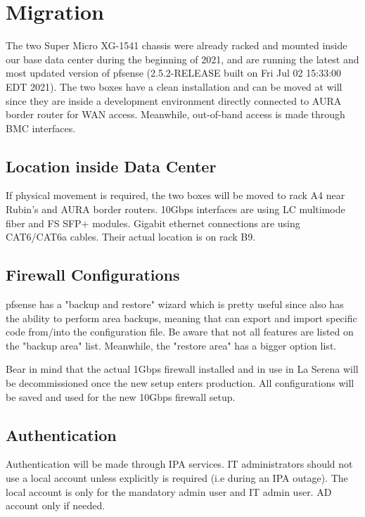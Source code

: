 \section{Migration}

The two Super Micro XG-1541 chassis were already racked and mounted inside our base data center during the beginning of 2021, and are running the latest and most updated version of pfsense (2.5.2-RELEASE built on Fri Jul 02 15:33:00 EDT 2021). The two boxes have a clean installation and can be moved at will since they are inside a development environment directly connected to AURA border router for WAN access. Meanwhile, out-of-band access is made through BMC interfaces.

\subsection{Location inside Data Center}

If physical movement is required, the two boxes will be moved to rack A4 near Rubin's and AURA border routers. 10Gbps interfaces are using LC multimode fiber and FS SFP+ modules. Gigabit ethernet connections are using CAT6/CAT6a cables. Their actual location is on rack B9.

\subsection{Firewall Configurations}

pfsense has a "backup and restore" wizard which is pretty useful since also has the ability to perform area backups, meaning that can export and import specific code from/into the configuration file. Be aware that not all features are listed on the "backup area" list. Meanwhile, the "restore area" has a bigger option list.

Bear in mind that the actual 1Gbps firewall installed and in use in La Serena will be decommissioned once the new setup enters production. All configurations will be saved and used for the new 10Gbps firewall setup.

\subsection{Authentication}

Authentication will be made through IPA services. IT administrators should not use a local account unless explicitly is required (i.e during an IPA outage). The local account is only for the mandatory admin user and IT admin user. AD account only if needed.

